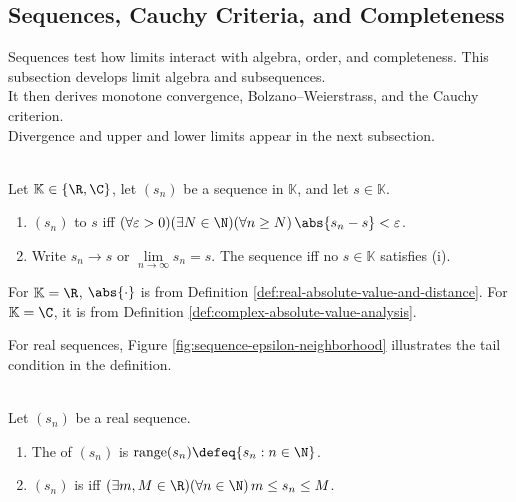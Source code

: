 \subsection{Sequences, Cauchy Criteria, and Completeness}

%

Sequences test how limits interact with algebra, order, and completeness. This subsection develops limit algebra and subsequences.\\
It then derives monotone convergence, Bolzano--Weierstrass, and the Cauchy criterion.\\
Divergence and upper and lower limits appear in the next subsection.

\begin{definition} \label{def:real-complex-sequence-convergence} \\
Let $\mathbb{K}\in\{\R,\C\}$, let $(s_n)$ be a sequence in $\mathbb{K}$, and let $s\in\mathbb{K}$.
\begin{enumerate}[label=(\roman*)]
\setlength{\itemsep}{0pt}
\item $(s_n)$  to $s$ iff $(\forall\varepsilon>0)(\exists N\in\N)(\forall n\geq N)\,\abs{s_n-s}<\varepsilon$.
\item Write $s_n\to s$ or $\lim\limits_{n\to\infty}s_n=s$. The sequence  iff no $s\in\mathbb{K}$ satisfies (i).
\end{enumerate}
For $\mathbb{K}=\R$, $\abs{\cdot}$ is from Definition \ref{def:real-absolute-value-and-distance}. For $\mathbb{K}=\C$, it is from Definition \ref{def:complex-absolute-value-analysis}.
\end{definition}

\begin{illustrationfigure}[H]
  \centering
  
  \caption{For a real sequence, the tail $\{s_n:n\geq N\}$ stays inside $(s-\varepsilon,s+\varepsilon)$.}
  \label{fig:sequence-epsilon-neighborhood}
\end{illustrationfigure}
For real sequences, Figure \ref{fig:sequence-epsilon-neighborhood} illustrates the tail condition in the definition.

\begin{definition} \label{def:real-sequence-range-and-boundedness} \\
Let $(s_n)$ be a real sequence.
\begin{enumerate}[label=(\roman*)]
\setlength{\itemsep}{0pt}
\item The  of $(s_n)$ is $\operatorname{range}(s_n)\defeq\{s_n:n\in\N\}$.
\item $(s_n)$ is  iff $(\exists m,M\in\R)(\forall n\in\N)\,m\leq s_n\leq M$.
\end{enumerate}
\end{definition}

